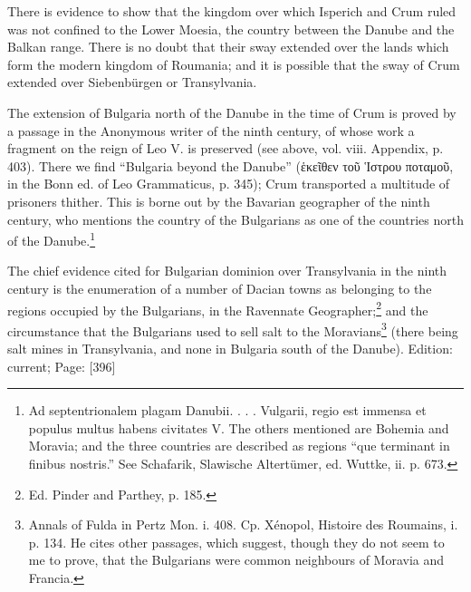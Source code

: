 There is evidence to show that the kingdom over which Isperich and Crum ruled was not confined to the Lower Moesia, the country between the Danube and the Balkan range. There is no doubt that their sway extended over the lands which form the modern kingdom of Roumania; and it is possible that the sway of Crum extended over Siebenbürgen or Transylvania.

The extension of Bulgaria north of the Danube in the time of Crum is proved by a passage in the Anonymous writer of the ninth century, of whose work a fragment on the reign of Leo V. is preserved (see above, vol. viii. Appendix, p. 403). There we find \texthebrew{“}Bulgaria beyond the Danube\texthebrew{}” (\textgreek{\texthebrew{ἑ}κε\texthebrew{ῖ}θεν το\texthebrew{ῦ Ἱ}στρου ποταμο\texthebrew{ῦ}}, in the Bonn ed. of Leo Grammaticus, p. 345); Crum transported a multitude of prisoners thither. This is borne out by the Bavarian geographer of the ninth century, who mentions the country of the Bulgarians as one of the countries north of the Danube.\footnote{Ad septentrionalem plagam Danubii. . . . Vulgarii, regio est immensa et populus multus habens civitates V. The others mentioned are Bohemia and Moravia; and the three countries are described as regions \texthebrew{“}que terminant in finibus nostris.\texthebrew{}” See Schafarik, Slawische Altertümer, ed. Wuttke, ii. p. 673.}

The chief evidence cited for Bulgarian dominion over Transylvania in the ninth century is the enumeration of a number of Dacian towns as belonging to the regions occupied by the Bulgarians, in the Ravennate Geographer;\footnote{Ed. Pinder and Parthey, p. 185.} and the circumstance that the Bulgarians used to sell salt to the Moravians\footnote{Annals of Fulda in Pertz Mon. i. 408. Cp. Xénopol, Histoire des Roumains, i. p. 134. He cites other passages, which suggest, though they do not seem to me to prove, that the Bulgarians were common neighbours of Moravia and Francia.} (there being salt mines in Transylvania, and none in Bulgaria south of the Danube).
Edition: current; Page: [396]

